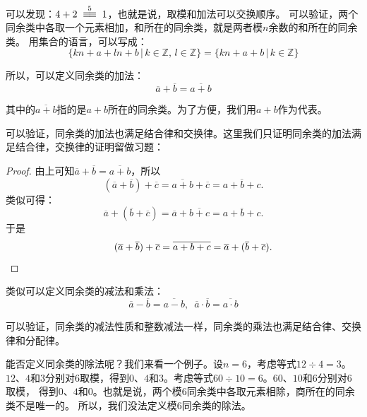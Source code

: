 \documentclass[12pt,UTF8]{ctexbook}
\begin{document}
可以发现：$ 4 + 2 \tong{5} 1$，也就是说，取模和加法可以交换顺序。
可以验证，两个同余类中各取一个元素相加，和所在的同余类，就是两者模$n$余数的和所在的同余类。
用集合的语言，可以写成：
$$\{kn + a + ln + b \, | \, k\in\mathbb{Z}, \, l\in\mathbb{Z} \} = \{kn + a + b \, | \, k\in\mathbb{Z} \}$$

所以，可以定义同余类的加法：
$$ \overline{a} + \overline{b} = \overline{a + b}$$

其中的$\overline{a + b}$指的是$a+b$所在的同余类。为了方便，我们用$a + b$作为代表。

可以验证，同余类的加法也满足结合律和交换律。这里我们只证明同余类的加法满足结合律，交换律的证明留做习题：

\begin{proof}
    由上可知$ \overline{a} + \overline{b} = \overline{a + b}$，所以
    $$ (\overline{a} + \overline{b}) + \overline{c} = \overline{a + b}+ \overline{c} = \overline{a + b + c}.$$
    类似可得：
    $$ \overline{a} + (\overline{b} + \overline{c}) = \overline{a}+ \overline{b + c} = \overline{a + b + c}.$$
    于是
    $$ \quad \quad \quad (\overline{a} + \overline{b}) + \overline{c}  = \overline{a + b + c} = \overline{a} + (\overline{b} + \overline{c}). \quad \qedhere$$
\end{proof}

类似可以定义同余类的减法和乘法：
$$ \overline{a} - \overline{b} = \overline{a - b}, \,\,\, \overline{a} \cdot \overline{b} = \overline{a \cdot b}$$

可以验证，同余类的减法性质和整数减法一样，同余类的乘法也满足结合律、交换律和分配律。

能否定义同余类的除法呢？我们来看一个例子。设$n=6$，考虑等式$12 \div 4 = 3$。
$12$、$4$和$3$分别对$6$取模，得到$0$、$4$和$3$。考虑等式$60 \div 10 = 6$。$60$、$10$和$6$分别对$6$取模，
得到$0$、$4$和$0$。也就是说，两个模$6$同余类中各取元素相除，商所在的同余类不是唯一的。
所以，我们没法定义模$6$同余类的除法。
\end{document}
